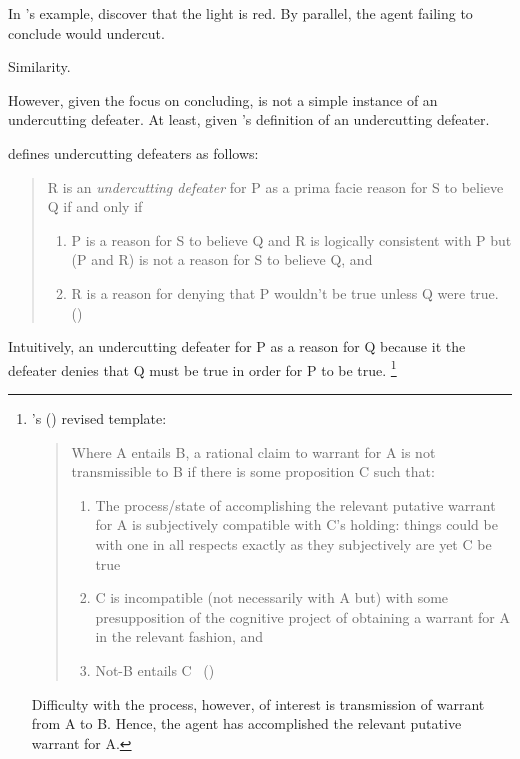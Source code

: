 \begin{note}
  In \citeauthor{Pollock:1987un}'s example, discover that the light is red.
  By parallel, the agent failing to conclude would undercut.
\end{note}

\begin{note}
  Similarity.

  However, given the focus on concluding, \curb{} is not a simple instance of an undercutting defeater.
  At least, given \citeauthor{Pollock:1987un}'s definition of an undercutting defeater.

  \citeauthor{Pollock:1987un} defines undercutting defeaters as follows:
  \begin{quote}
    R is an \emph{undercutting defeater} for P as a prima facie reason for S to believe Q if and only if
    \begin{enumerate}[label=(UD\arabic*), ref=(UD\arabic*)]
    \item
      \label{pollock:ud:1}
      P is a reason for S to believe Q and R is logically consistent with P but (P and R) is not a reason for S to believe Q, and
    \item
      \label{pollock:ud:2}
      R is a reason for denying that P wouldn't be true unless Q were true.%
      \mbox{}\hfill\mbox{(\citeyear[485]{Pollock:1987un})}
    \end{enumerate}
  \end{quote}
  Intuitively, an undercutting defeater for P as a reason for Q because it the defeater denies that Q must be true in order for P to be true.%
  \footnote{
    \citeauthor{Wright:2011wn}'s (\citeyear{Wright:2011wn}) revised template:
    \begin{quote}
      Where A entails B, a rational claim to warrant for A is not transmissible to B if there is some proposition C such that:
      \begin{enumerate}[label=(\roman*), noitemsep]
      \item
        The process/state of accomplishing the relevant putative warrant for A is subjectively compatible with C’s holding: things could be with one in all respects exactly as they subjectively are yet C be true
      \item
        C is incompatible (not necessarily with A but) with some presupposition of the cognitive project of obtaining a warrant for A in the relevant fashion, and
      \item
        Not-B entails C%
      \mbox{ }\hfill\mbox{(\citeyear[93]{Wright:2011wn})}
      \end{enumerate}
    \end{quote}
    Difficulty with the process, however, of interest is transmission of warrant from A to B.
    Hence, the agent has accomplished the relevant putative warrant for A.

}
\end{note}
